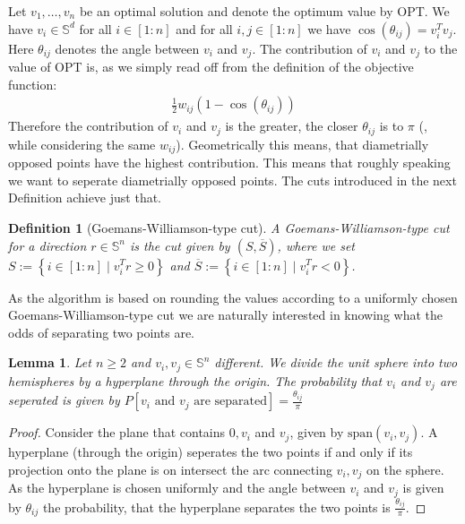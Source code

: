 \documentclass[12pt,a4paper]{article}
\theoremstyle{mythm}
\newtheorem{Def}[thm]{Definition}
\newtheorem{lem}[thm]{Lemma}
\begin{document}
Let $ v_1 , \dots , v_n $ be an optimal solution and denote the optimum value by OPT.
We have $ v_i \in \mathbb{S} ^{ d }  $ for all $ i \in \left[ 1:n \right]  $ and 
for all $ i,j \in \left[ 1:n \right]  $ we have $ \cos( \theta _{ ij }  ) = v_i ^T v_j $. 
Here $ \theta _{ ij }  $ denotes the angle between $ v_i $ and $ v_j $.
The contribution of $ v_i $ and $ v_j $ to the value of OPT is, as we simply read off from the definition of the objective function:
\begin{align*}
\frac{ 1 }{ 2 } w _{ ij } \left( 1 - \cos( \theta _{ ij }  )  \right) 
\end{align*} 
Therefore the contribution of $ v_i $ and $ v_j $ is the greater, the closer $ \theta _{ ij }  $ is to $ \pi  $ (, while considering the same $ w _{ ij }  $). 
Geometrically this means, that diametrially opposed points have the highest contribution.
This means that roughly speaking we want to seperate diametrially opposed points.
The cuts introduced in the next Definition achieve just that.
\begin{Def}[Goemans-Williamson-type cut] 
A Goemans-Williamson-type cut for a direction $ r \in \mathbb{S} ^{ n }  $ is the cut given by 
$ \left( S , \overline{ S }  \right)  $, where we set $ S := \left\{ i \in \left[ 1:n \right]  \mid  v_i ^T r \geq 0  \right\}  $ and 
$ \overline{ S }  := \left\{ i \in \left[ 1:n \right] \mid  v_i ^T r < 0  \right\} $.
\end{Def} 
As the algorithm is based on rounding the values according to a uniformly chosen Goemans-Williamson-type cut we are naturally interested in knowing what the odds of separating
two points are.
\begin{lem}
\label{lem:angle} 
Let $ n \geq 2  $ and $ v_i , v_j \in \mathbb{S} ^{ n } $ different. We divide the unit sphere into two hemispheres by a hyperplane through the origin.
The probability that $ v_i $ and $ v_j $ are seperated is given by $ P \left[ v_i \text{ and } v_j \text{ are separated}  \right] = \frac{ \theta _{ ij }  }{ \pi }   $
\end{lem} 
\begin{proof}
Consider the plane that contains $ 0,v_i $ and $ v_j $, given by $ \text{span} \left( v_i, v_j \right) $.
A hyperplane (through the origin) seperates the two points if and only if its projection onto the plane is on intersect the arc connecting $ v_i, v_j $ on the sphere.
As the hyperplane is chosen uniformly and the angle between $ v_i $ and $ v_j $ is given by $ \theta _{ ij }  $ the probability, that the hyperplane separates the two points is $ \frac{ \theta _{ ij }  }{ \pi }  $.
\end{proof}
\end{document}
